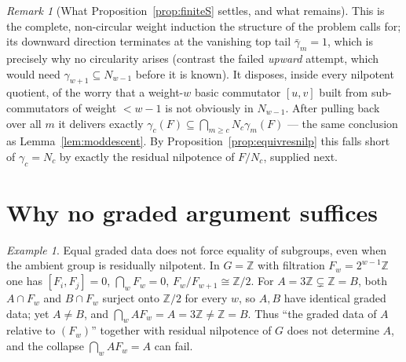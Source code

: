 \documentclass{amsart}
\theoremstyle{definition}
\theoremstyle{remark}
\newtheorem{remark}{Remark}
\newtheorem{example}{Example}
\begin{document}
\begin{remark}[What Proposition~\ref{prop:finiteS} settles, and what remains]
\label{rem:finite-limit}
This is the complete, non-circular weight induction the structure of the problem
calls for; its downward direction terminates at the vanishing top tail
$\bar\gamma_m=1$, which is precisely why no circularity arises (contrast the failed
\emph{upward} attempt, which would need $\gamma_{w+1}\subseteq N_{w-1}$ before it is
known). It disposes, inside every nilpotent quotient, of the worry that a weight-$w$
basic commutator $[u,v]$ built from sub-commutators of weight $<w-1$ is not obviously
in $N_{w-1}$. After pulling back over all $m$ it delivers exactly
$\gamma_c(F)\subseteq\bigcap_{m\ge c}N_c\gamma_m(F)$ --- the same conclusion as
Lemma~\ref{lem:moddescent}. By Proposition~\ref{prop:equivresnilp} this falls short
of $\gamma_c=N_c$ by exactly the residual nilpotence of $F/N_c$, supplied next.
\end{remark}

\section{Why no graded argument suffices}\label{sec:why}

\begin{example}\label{ex:Z}
Equal graded data does not force equality of subgroups, even when the ambient group
is residually nilpotent. In $G=\mathbb Z$ with filtration $F_w=2^{w-1}\mathbb Z$ one
has $[F_i,F_j]=0$, $\bigcap_w F_w=0$, $F_w/F_{w+1}\cong\mathbb Z/2$. For
$A=3\mathbb Z\subsetneq\mathbb Z=B$, both $A\cap F_w$ and $B\cap F_w$ surject onto
$\mathbb Z/2$ for every $w$, so $A,B$ have identical graded data; yet $A\ne B$, and
$\bigcap_w A F_w=A=3\mathbb Z\ne\mathbb Z=B$. Thus ``the graded data of $A$ relative
to $(F_w)$'' together with residual nilpotence of $G$ does not determine $A$, and the
collapse $\bigcap_w AF_w=A$ can fail.
\end{example}
\end{document}
